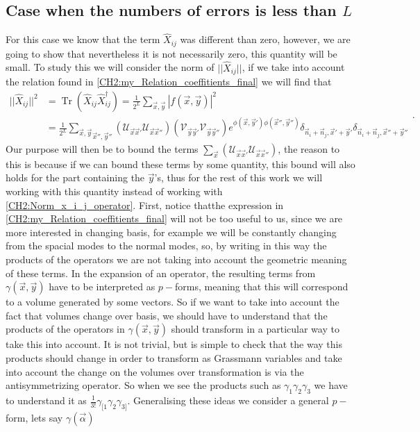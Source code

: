\subsection{Case when the numbers of errors is less than $L$}
 For this case we know that the term $\hat{X}_{ij}$ was different than zero, however, we are going to show that nevertheless it is not necessarily zero, this quantity will be small. To study this we will consider the norm of $||\hat{X}_{ij}||$, if we take into account the relation found in \eqref{CH2:my_Relation_coeffitients_final} we will find that
\begin{equation}
\begin{aligned}
||\hat{X}_{ij}||^{2}&=\operatorname{Tr}\left(\hat{X}_{ij} \hat{X}^{\dagger}_{ij}\right) = \frac{1}{2^L}\sum_{\vec{x},\vec{y}}|f(\vec{x},\vec{y})|^2\\
&=\frac{1}{2^L}\underset{\vec{x}'',\vec{y}''}{\sum_{\vec{x},\vec{y}}}\left(	\mathcal{U}_{\vec{x}\vec{x}'} \mathcal{U}_{\vec{x}\vec{x}''}\right) \left(	\mathcal{V}_{\vec{y}\vec{y}'} \mathcal{V}_{\vec{y}\vec{y}''}\right) e^{\phi(\vec{x},\vec{y}')\phi(\vec{x}'',\vec{y}'')}\delta_{\vec{n}_i+\vec{n}_j,\vec{x}'+\vec{y}'}\delta_{\vec{n}_i+\vec{n}_j,\vec{x}''+\vec{y}''}
\end{aligned}.
\label{CH2:Norm_x_i_j_operator}
\end{equation}
Our purpose will then be to bound the terms $\sum_{\vec{x}}\left(	\mathcal{U}_{\vec{x}\vec{x}'} \mathcal{U}_{\vec{x}\vec{x}''}\right)$, the reason to this is because if we can bound these terms by some quantity, this bound will also holds for the part containing the $\vec{y}$'s, thus for the rest of this work we will working with this quantity instead of working with \eqref{CH2:Norm_x_i_j_operator}. First, notice thatthe expression in \eqref{CH2:my_Relation_coeffitients_final} will not be too useful to us, since we are more interested in changing basis, for example we will be constantly changing from the spacial modes to the normal modes, so, by writing in this way the products of the operators we are not taking into account the geometric meaning of these terms. In the expansion of an operator, the resulting terms from $\gamma(\vec{x},\vec{y})$ have to be interpreted as $p-$forms, meaning that this will correspond to a volume generated by some vectors. So if we want to take into account the fact that volumes change over basis, we should have to understand that the products of the operators in $\gamma(\vec{x},\vec{y})$ should transform in a particular way to take this into account. It is not trivial, but is simple to check that the way this products should change in order to transform as Grassmann variables and take into account the change on the volumes over transformation is via the antisymmetrizing operator. So when we see the products such as $\gamma_{1}\gamma_{2}\gamma_{3}$ we have to understand it as $\frac{1}{3!}\gamma_{[1}\gamma_2\gamma_{3]}$. Generalising these ideas we consider a general $p-$form, lets say $\gamma(\vec{\alpha})$

